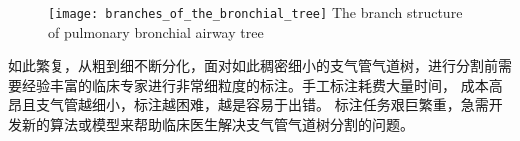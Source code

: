 \begin{figure}[!htp]
	\centering
	\texttt{[image: branches\_of\_the\_bronchial\_tree]}
		{The branch structure of pulmonary bronchial airway tree}
	\label{fig:branches_of_bronchial_tree}	
\end{figure}

如此繁复，从粗到细不断分化，面对如此稠密细小的支气管气道树，进行分割前需要经验丰富的临床专家进行非常细粒度的标注。手工标注耗费大量时间，
成本高昂且支气管越细小，标注越困难，越是容易于出错。 标注任务艰巨繁重，急需开发新的算法或模型来帮助临床医生解决支气管气道树分割的问题。



